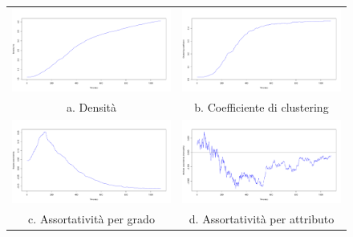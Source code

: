 \documentclass[a4paper,12pt]{article}
\begin{document}
\begin{figure}[h]
\begin{tabular}{cc}
  \includegraphics[width=81mm]{images/evolution_1000_rnd_1080_1_0.pdf} &   \includegraphics[width=81mm]{images/clustering_1000_rnd_1080_1_0.pdf} \\
a. Densità & b. Coefficiente di clustering \\[6pt]
 \includegraphics[width=81mm]{images/deg_assortativity_1000_rnd_1080_1_0.pdf} &   \includegraphics[width=81mm]{images/homophily_1000_rnd_1080_1_0.pdf} \\
c. Assortatività per grado & d. Assortatività per attributo \\[6pt]
\end{tabular}
\end{figure}
\end{document}
